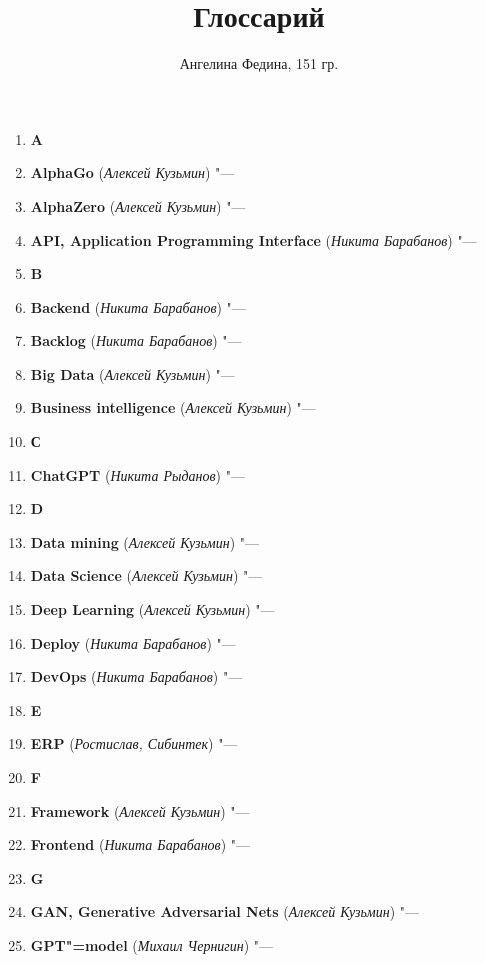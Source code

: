 \documentclass[a4paper, 14 pt]{extarticle}
\title{\textbf{Глоссарий}}
\author{Ангелина Федина, 151 гр.}
\date{}
\begin{document}
\maketitle
\thispagestyle{empty}
\pagestyle{empty}

\begin{enumerate}
    \item[] \large{\textbf{A}}
    \item \textbf{AlphaGo} (\textit{Алексей Кузьмин}) "--- 
    \item \textbf{AlphaZero} (\textit{Алексей Кузьмин}) "--- 
    \item \textbf{API, Application Programming Interface} 
    (\textit{Никита Барабанов}) "--- 
    \item[] \textbf{B}
    \item \textbf{Backend} (\textit{Никита Барабанов}) "---
    \item \textbf{Backlog} (\textit{Никита Барабанов}) "--- 
    \item \textbf{Big Data} (\textit{Алексей Кузьмин}) "--- 
    \item \textbf{Business intelligence} (\textit{Алексей Кузьмин}) "--- 
    \item[] \textbf{С}
    \item \textbf{ChatGPT} (\textit{Никита Рыданов}) "--- 
    \item[] \textbf{D}
    \item \textbf{Data mining} (\textit{Алексей Кузьмин}) "--- 
    \item \textbf{Data Science} (\textit{Алексей Кузьмин}) "--- 
    \item \textbf{Deep Learning} (\textit{Алексей Кузьмин}) "--- 
    \item \textbf{Deploy} (\textit{Никита Барабанов}) "--- 
    \item \textbf{DevOps} (\textit{Никита Барабанов}) "--- 
    \item[] \textbf{E}
    \item \textbf{ERP} (\textit{Ростислав, Сибинтек}) "--- 
    \item[] \textbf{F}
    \item \textbf{Framework} (\textit{Алексей Кузьмин}) "--- 
    \item \textbf{Frontend} (\textit{Никита Барабанов}) "--- 
    \item[] \textbf{G}
    \item \textbf{GAN, Generative Adversarial Nets} (\textit{Алексей Кузьмин}) 
    "--- 
    \item \textbf{GPT"=model} (\textit{Михаил Чернигин}) "--- 

\end{enumerate}
\end{document}
